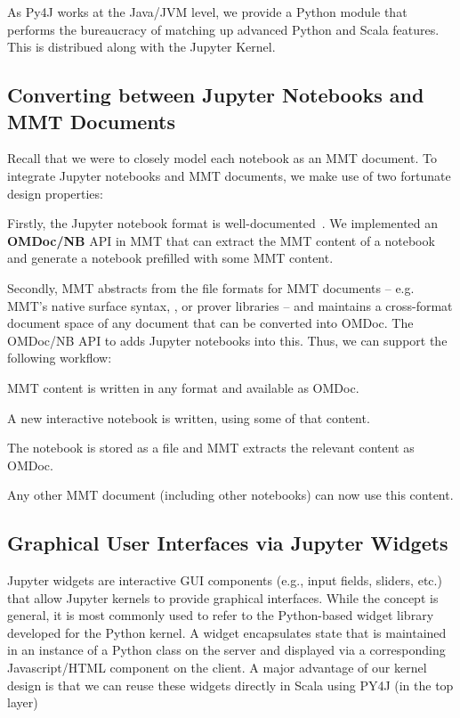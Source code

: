 As Py4J works at the Java/JVM level, we provide a Python module that performs the bureaucracy of matching up advanced Python and Scala features.
This is distribued along with the Jupyter Kernel. 

\subsection{Converting between Jupyter Notebooks and MMT Documents}\label{sec:kernel:mapping}

Recall that we were to closely model each notebook as an MMT document. 
To integrate Jupyter notebooks and MMT documents, we make use of two fortunate design properties:

Firstly, the Jupyter notebook format is well-documented~\cite{nbformat:on}. 
We implemented an \textbf{OMDoc/NB} API in MMT that can extract the MMT content of a notebook and generate a notebook prefilled with some MMT content.

Secondly, MMT abstracts from the file formats for MMT documents -- e.g. MMT's native surface syntax, \sTeX, or prover libraries -- and  maintains a cross-format document space  of any document that can be converted into OMDoc.
The OMDoc/NB API to adds Jupyter notebooks into this.
Thus, we can support the following workflow:
\begin{compactenum}
 \item MMT content is written in any format and available as OMDoc.
 \item A new interactive notebook is written, using some of that content.
 \item The notebook is stored as a file and MMT extracts the relevant content as OMDoc.
 \item Any other MMT document (including other notebooks) can now use this content.
\end{compactenum}

\subsection{Graphical User Interfaces via Jupyter Widgets}\label{sec:kernel:widgets}


Jupyter widgets are interactive GUI components (e.g., input fields, sliders, etc.) that allow Jupyter kernels to provide graphical interfaces.
While the concept is general, it is most commonly used to refer to the Python-based widget library developed for the Python kernel.
A widget encapsulates state that is maintained in an instance of a Python class on the server and displayed via a corresponding Javascript/HTML component on the client.
A major advantage of our kernel design is that we can reuse these widgets directly in Scala using PY4J (in the top layer)

